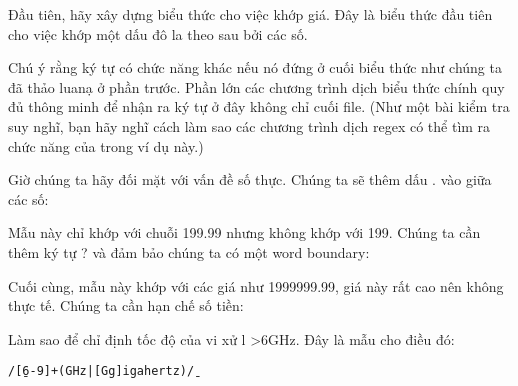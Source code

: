 Đầu tiên, hãy xây dựng biểu thức cho việc khớp giá. Đây là biểu thức đầu tiên cho việc khớp một dấu đô la theo sau bởi các số.

\codeexamples{/$[0-9]+/}

	Chú ý rằng ký tự  có chức năng khác nếu nó đứng ở cuối biểu thức như chúng ta đã thảo luanạ ở phần trước. Phần lớn các chương trình dịch biểu thức chính quy đủ thông minh để nhận ra ký tự  ở đây không chỉ cuối file. (Như một bài kiểm tra suy nghĩ, bạn hãy nghĩ cách làm sao các chương trình dịch regex có thể tìm ra chức năng của  trong ví dụ này.)

Giờ chúng ta hãy đối mặt với vấn đề số thực. Chúng ta sẽ thêm dấu . vào giữa các số:

\codeexamples{/$[0-9]+\.[0-9][0-9]/}

Mẫu này chỉ khớp với chuỗi 199.99 nhưng không khớp với 199. Chúng ta cần thêm ký tự ? và đảm bảo chúng ta có một word boundary:


Cuối cùng, mẫu này khớp với các giá như 1999999.99, giá này rất cao nên không thực tế. Chúng ta cần hạn chế số tiền:


Làm sao để chỉ định tốc độ của vi xử l >6GHz. Đây là mẫu cho điều đó:

\vspace{0.6em}

\noindent \texttt{/\b[6-9]+\textvisiblespace*(GHz|[Gg]igahertz)\b/}

\vspace{0.6em}

